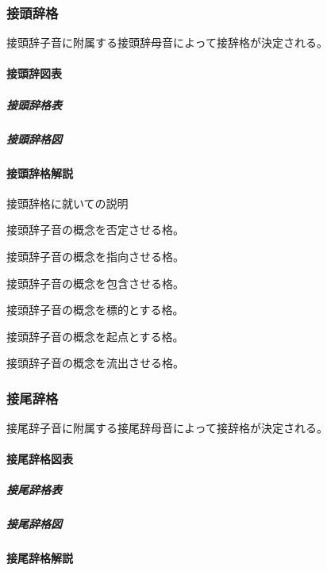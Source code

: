 \documentclass[
  japanese,
]{article}
\providecommand{\tightlist}{%
  \setlength{\itemsep}{0pt}\setlength{\parskip}{0pt}}
\begin{document}
\subsubsection{接頭辞格}\label{section5.4}

接頭辞子音に附属する接頭辞母音によって接辞格が決定される。

\paragraph{接頭辞図表}\label{subsection5.4.1}

\subparagraph{接頭辞格表}\label{subsubsection5.4.1.1}

\subparagraph{接頭辞格図}\label{subsubsection5.4.1.2}

\paragraph{接頭辞格解説}\label{subsection5.4.2}

接頭辞格に就いての説明

\begin{description}
\tightlist
\item[否格]
接頭辞子音の概念を否定させる格。
\item[与格]
接頭辞子音の概念を指向させる格。
\item[属格]
接頭辞子音の概念を包含させる格。
\item[対格]
接頭辞子音の概念を標的とする格。
\item[主格]
接頭辞子音の概念を起点とする格。
\item[流格]
接頭辞子音の概念を流出させる格。
\end{description}

\subsubsection{接尾辞格}\label{section5.5}

接尾辞子音に附属する接尾辞母音によって接辞格が決定される。

\paragraph{接尾辞格図表}\label{subsection5.5.1}

\subparagraph{接尾辞格表}\label{subsubsection5.5.1.1}

\subparagraph{接尾辞格図}\label{subsubsection5.5.1.2}

\paragraph{接尾辞格解説}\label{subsection5.5.2}
\end{document}
